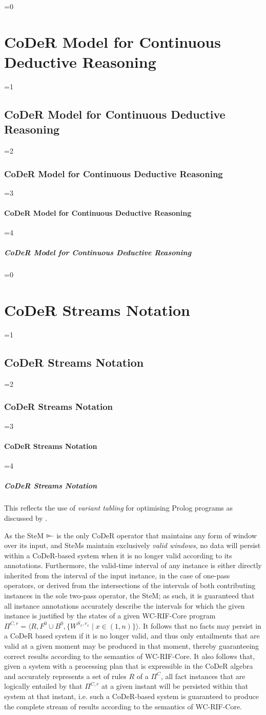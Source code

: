 \documentclass[twocolumn,preprint,3p,number]{elsarticle}
\theoremstyle{plain}
\theoremstyle{definition}
\newcounter{nestingdepth}
\newenvironment{nestedsection}[2]{
  \ifnum\value{nestingdepth}=0
    \chapter{#1}
  \else
    \ifnum\value{nestingdepth}=1
      \section{#1}
    \else
      \ifnum\value{nestingdepth}=2
        \subsection{#1}
      \else
        \ifnum\value{nestingdepth}=3
          \subsubsection{#1}
        \else
          \ifnum\value{nestingdepth}=4
            \paragraph{#1}
          \else
            \PackageError{nestedsections}{Maximum nesting level exceeded!}{uh oh!}
          \fi
        \fi
      \fi
    \fi
  \fi
  \addtocounter{nestingdepth}{1}
  \label{sec:#2}
}{\addtocounter{nestingdepth}{-1}}
\def\rstreamjoin{\mathbin{\rhd\mkern-2mu%
  \setbox0=\hbox{$\rhd$}%
    \rule[0.21em]{.5em}{.4pt}%
}}
\begin{document}
\begin{nestedsection}{CoDeR Model for Continuous Deductive Reasoning}{model}
\begin{nestedsection}{CoDeR Streams Notation}{model: stream notation}
  This reflects the use of \emph{variant tabling} for optimising Prolog programs as discussed by \citet{DS4SbsmptvTbls}.
\end{nestedsection}

  As the SteM $\rstreamjoin$ is the only CoDeR operator that maintains any form of window over its input, and SteMs maintain exclusively \emph{valid windows}, no data will persist within a CoDeR-based system when it is no longer valid according to its annotations.
  Furthermore, the valid-time interval of any instance is either directly inherited from the interval of the input instance, in the case of one-pass operators, or derived from the intersections of the intervals of both contributing instances in the sole two-pass operator, the SteM;
  as such, it is guaranteed that all instance annotations accurately describe the intervals for which the given instance is justified by the states of a given WC-RIF-Core program ${\Pi^{C,r} = \langle R,F^0 \cup B^0, \{ W^{S_x,r_x} \mid x \in (1,n) \} \rangle}$.
  It follows that no facts may persist in a CoDeR based system if it is no longer valid, and thus only entailments that are valid at a given moment may be produced in that moment, thereby guaranteeing correct results according to the semantics of WC-RIF-Core.
  It also follows that, given a system with a processing plan that is expressible in the CoDeR algebra and accurately represents a set of rules $R$ of a $\Pi^C$, all fact instances that are logically entailed by that $\Pi^{C,r}$ at a given instant will be persisted within that system at that instant,
  i.e. such a CoDeR-based system is guaranteed to produce the complete stream of results according to the semantics of WC-RIF-Core.
\end{nestedsection}
\end{document}
